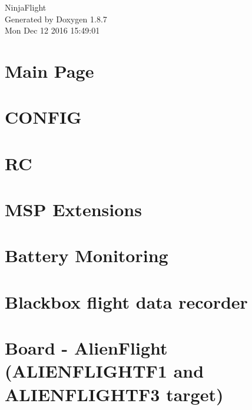 \documentclass[twoside]{book}
\newcommand{\+}{\discretionary{\mbox{\scriptsize$\hookleftarrow$}}{}{}}
\newcommand{\clearemptydoublepage}{%
  \newpage{\pagestyle{empty}\cleardoublepage}%
}
\begin{document}
\hypersetup{pageanchor=false,
             bookmarks=true,
             bookmarksnumbered=true,
             pdfencoding=unicode
            }
\begin{titlepage}
\vspace*{7cm}
\begin{center}%
{\Large Ninja\+Flight }\\
\vspace*{1cm}
{\large Generated by Doxygen 1.8.7}\\
\vspace*{0.5cm}
{\small Mon Dec 12 2016 15:49:01}\\
\end{center}
\end{titlepage}
\clearemptydoublepage
\tableofcontents
\clearemptydoublepage
{}
\hypersetup{pageanchor=true}

\chapter{Main Page}
\label{index}\hypertarget{index}{}
\chapter{C\+O\+N\+F\+I\+G}
\label{CONFIG}
\hypertarget{CONFIG}{}

\chapter{R\+C}
\label{RC}
\hypertarget{RC}{}

\chapter{M\+S\+P Extensions}
\label{md_docs_API_MSP_extensions}
\hypertarget{md_docs_API_MSP_extensions}{}

\chapter{Battery Monitoring}
\label{md_docs_Battery}
\hypertarget{md_docs_Battery}{}

\chapter{Blackbox flight data recorder}
\label{md_docs_Blackbox}
\hypertarget{md_docs_Blackbox}{}

\chapter{Board -\/ Alien\+Flight (A\+L\+I\+E\+N\+F\+L\+I\+G\+H\+T\+F1 and A\+L\+I\+E\+N\+F\+L\+I\+G\+H\+T\+F3 target)}
\label{md_docs_Board_-_AlienFlight}
\hypertarget{md_docs_Board_-_AlienFlight}{}

\end{document}
